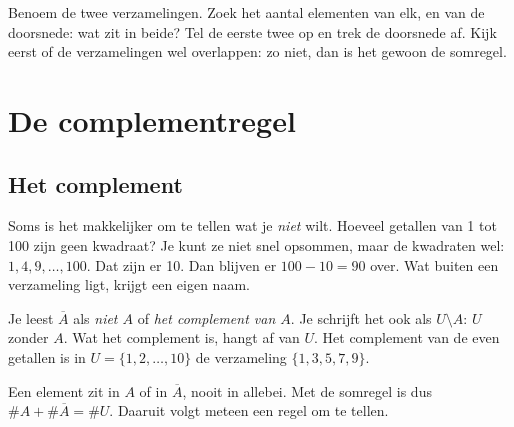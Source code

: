 \begin{werkwijze}
Benoem de twee verzamelingen. Zoek het aantal elementen van elk, en van de doorsnede: wat zit in beide? Tel de eerste twee op en trek de doorsnede af. Kijk eerst of de verzamelingen wel overlappen: zo niet, dan is het gewoon de somregel.
\end{werkwijze}

\begin{oefeningen}
\end{oefeningen}

\section{De complementregel}

\subsection{Het complement}

Soms is het makkelijker om te tellen wat je \textit{niet} wilt. Hoeveel getallen van 1 tot 100 zijn geen kwadraat? Je kunt ze niet snel opsommen, maar de kwadraten wel: $1, 4, 9, \ldots, 100$. Dat zijn er 10. Dan blijven er $100 - 10 = 90$ over. Wat buiten een verzameling ligt, krijgt een eigen naam.

\begin{theorie}
\end{theorie}

Je leest $\overline{A}$ als \textit{niet $A$} of \textit{het complement van $A$}. Je schrijft het ook als $U \setminus A$: $U$ zonder $A$. Wat het complement is, hangt af van $U$. Het complement van de even getallen is in $U = \{1, 2, \ldots, 10\}$ de verzameling $\{1, 3, 5, 7, 9\}$.

Een element zit in $A$ of in $\overline{A}$, nooit in allebei. Met de somregel is dus $\#A + \#\overline{A} = \#U$. Daaruit volgt meteen een regel om te tellen.

